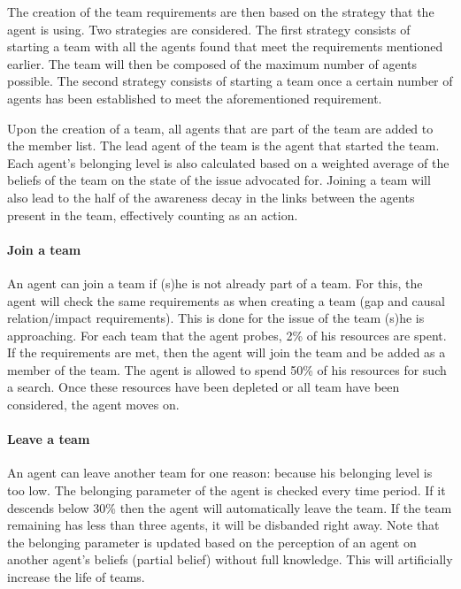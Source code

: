 The creation of the team requirements are then based on the strategy that the agent is using. Two strategies are considered. The first strategy consists of starting a team with all the agents found that meet the requirements mentioned earlier. The team will then be composed of the maximum number of agents possible. The second strategy consists of starting a team once a certain number of agents has been established to meet the aforementioned requirement.

Upon the creation of a team, all agents that are part of the team are added to the member list. The lead agent of the team is the agent that started the team. Each agent's belonging level is also calculated based on a weighted average of the beliefs of the team on the state of the issue advocated for. Joining a team will also lead to the half of the awareness decay in the links between the agents present in the team, effectively counting as an action.

\paragraph{Join a team}

An agent can join a team if (s)he is not already part of a team. For this, the agent will check the same requirements as when creating a team (gap and causal relation/impact requirements). This is done for the issue of the team (s)he is approaching. For each team that the agent probes, 2\% of his resources are spent. If the requirements are met, then the agent will join the team and be added as a member of the team. The agent is allowed to spend 50\% of his resources for such a search. Once these resources have been depleted or all team have been considered, the agent moves on.

\paragraph{Leave a team}

An agent can leave another team for one reason: because his belonging level is too low. The belonging parameter of the agent is checked every time period. If it descends below 30\% then the agent will automatically leave the team. If the team remaining has less than three agents, it will be disbanded right away. Note that the belonging parameter is updated based on the perception of an agent on another agent's beliefs (partial belief) without full knowledge. This will artificially increase the life of teams. 

